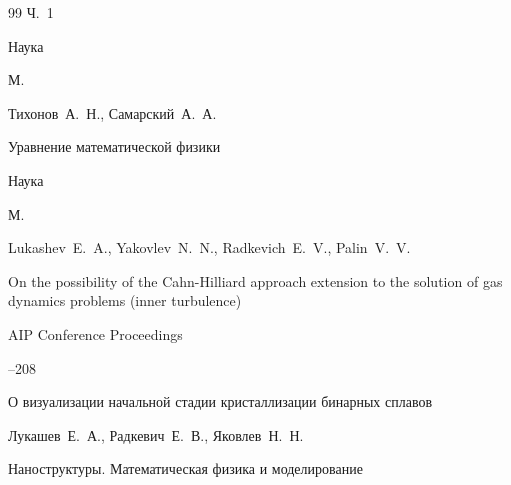 \begin{thebibliography}{99}
\bookinfo Ч.~1


\publ Наука

\publaddr М.







%






\by Тихонов~А.~Н., Самарский~А.~А.

\book Уравнение математической физики


\publ Наука

\publaddr М.








\by Lukashev~E.~A., Yakovlev~N.~N., Radkevich~E.~V., Palin~V.~V.

\paper On the possibility of the Cahn-Hilliard approach extension to the solution of gas dynamics problems (inner turbulence)

\jour AIP Conference Proceedings 


--208










\paper  О визуализации начальной стадии кристаллизации бинарных сплавов

\by Лукашев~Е.~А., Радкевич~Е.~В., Яковлев~Н.~Н.

\jour Наноструктуры. Математическая физика и моделирование





\end{thebibliography}
